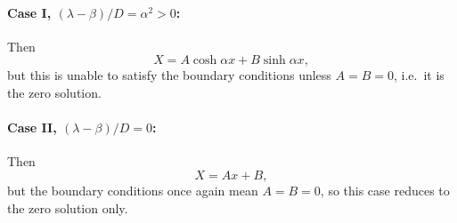 \documentclass[a4paper, 12pt]{article}
\begin{document}
\begin{enumerate}[label={\bf \arabic{*}.\;}, ref={\arabic{*}},itemsep=3ex, left=0ex]
{\begin{enumerate}[label=(\alph*)]
          \paragraph{Case I, $(\lambda-\beta)/D = \alpha^2 > 0$:} Then
          \begin{equation}
            X = A\cosh \alpha x  + B\sinh \alpha x ,
          \end{equation}
          but this is unable to satisfy the boundary conditions unless  $A=B=0$, i.e.\ it is the zero solution.

          \paragraph{Case II, $(\lambda-\beta)/D = 0$: } Then
          \begin{equation}
            X = Ax+B,
          \end{equation}
          but the boundary conditions once again mean $A=B=0$, so this case reduces to the zero solution only.


\end{enumerate}}
\end{enumerate}
\end{document}
